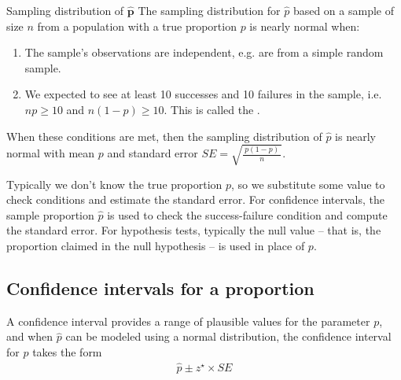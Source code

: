 \begin{onebox}{Sampling distribution of $\mathbf{\hat{p}}$}
  The sampling distribution for $\hat{p}$ based on
  a sample of size $n$ from a population with a true
  proportion $p$ is nearly normal when:
  \begin{enumerate}
  \setlength{\itemsep}{0mm}
  \item The sample's observations are independent,
      e.g. are from a simple random sample.
  \item We expected to see at least 10 successes and
      10 failures in the sample, i.e. $np\geq10$ and
      $n(1-p)\geq10$.
      This is called the .
  \end{enumerate}
  When these conditions are met, then the sampling
  distribution of $\hat{p}$ is nearly normal with mean
  $p$ and standard error
  $SE = \sqrt{\frac{\ p(1-p)\ }{n}}$.
\end{onebox}

Typically we don't know the true proportion $p$,
so we substitute some value to check conditions
and estimate the standard error.
For confidence intervals, the sample proportion
$\hat{p}$ is used to check the success-failure condition
and compute the standard error.
For hypothesis tests, typically the null value --
that is, the proportion claimed in the null hypothesis --
is used in place of $p$.


\subsection{Confidence intervals for a proportion}
\label{confIntForPropSection}


A confidence interval provides a range of
plausible values for the parameter $p$,
and when $\hat{p}$ can be modeled using a
normal distribution, the confidence interval
for $p$ takes the form
\begin{align*}
\hat{p} \pm z^{\star} \times SE
\end{align*}


\newcommand{\paydayN}{826}
\newcommand{\paydayNHalf}{413}
\newcommand{\paydayRegPerc}{70\%}
\newcommand{\paydayRegProp}{0.70}
\newcommand{\paydayRegSE}{0.016}
\newcommand{\paydayRegSEPerc}{1.6\%}
\newcommand{\paydayRegLower}{0.669}
\newcommand{\paydayRegUpper}{0.731}
\newcommand{\paydayRegLowerPerc}{66.9\%}
\newcommand{\paydayRegUpperPerc}{73.1\%}

